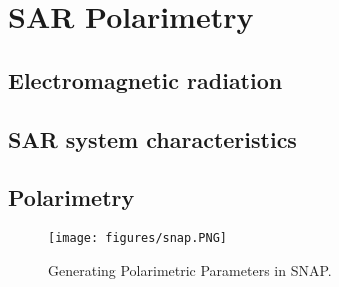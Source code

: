 \chapter{SAR Polarimetry}\label{chp:obs}%


\section{Electromagnetic radiation}
\section{SAR system characteristics} \label{sec:pr_obs}
\section{Polarimetry}

	\begin{figure}[H]
    \centering
    \texttt{[image: figures/snap.PNG]}
    \decoRule
    \caption[Generating Polarimetric Parameters in SNAP]{Generating Polarimetric Parameters in SNAP.}
    \label{fig:undercatch}
\end{figure}

	


